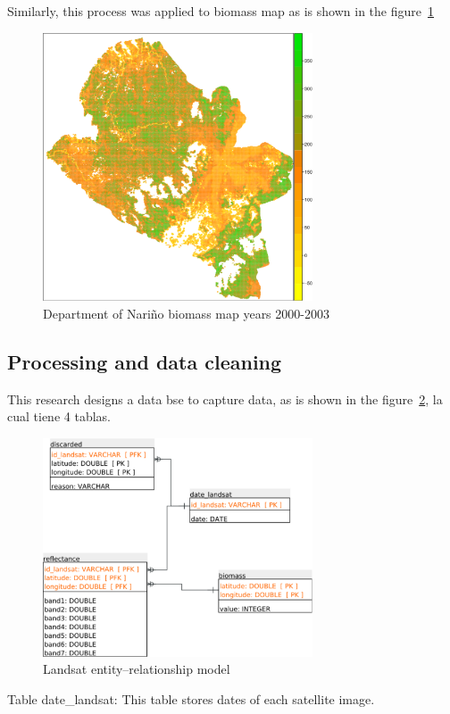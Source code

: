 Similarly, this process was applied to biomass map as is shown in the figure~\ref{fig:mapaNarino}

\begin{figure}
  \centering
  \includegraphics[width = 8cm]{mapaNarino.pdf}
  \caption{Department of Nariño biomass map years 2000-2003 \cite{baccini2008afirst}}
  \label{fig:mapaNarino}
\end{figure}

\subsection{Processing and data cleaning}

This research designs a data bse to capture data, as is shown in the figure~\ref{fig:landsatET}, la cual tiene 4 tablas. 

\begin{figure}
  \centering
  \includegraphics[width = 8cm]{landsatET.pdf}
  \caption{Landsat entity–relationship model}
  \label{fig:landsatET}
\end{figure}

Table date\_landsat: This table stores dates of each satellite image.

